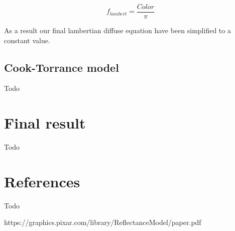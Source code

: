 \documentclass{article}
\begin{document}
\[
    f_{lambert} = \frac{Color}{\pi}
\]

As a result our final lambertian diffuse equation have been simplified to a constant value.

\subsection{Cook-Torrance model}
Todo

\section{Final result}
Todo

\section{References}
Todo

https://graphics.pixar.com/library/ReflectanceModel/paper.pdf
\end{document}
